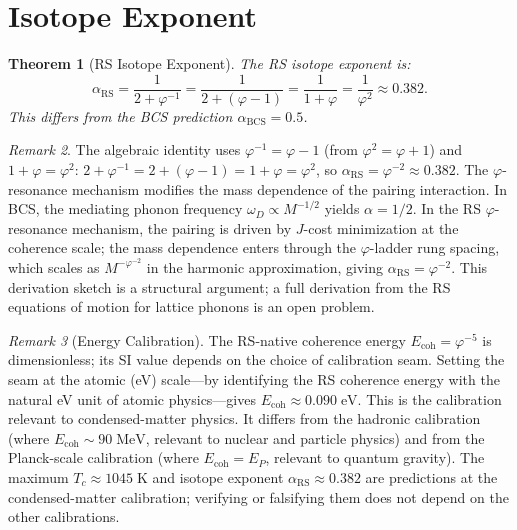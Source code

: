 \documentclass[12pt,a4paper]{article}
\newtheorem{theorem}{Theorem}[section]
\theoremstyle{definition}
\theoremstyle{remark}
\newtheorem{remark}[theorem]{Remark}
\begin{document}
\section{Isotope Exponent}
\label{sec:isotope}

\begin{theorem}[RS Isotope Exponent]
\label{thm:isotope}
The RS isotope exponent is:
\begin{equation}
  \boxed{\alpha_{\mathrm{RS}} = \frac{1}{2 + \varphi^{-1}}
  = \frac{1}{2 + (\varphi - 1)} = \frac{1}{1 + \varphi}
  = \frac{1}{\varphi^2} \approx 0.382.}
\end{equation}
This differs from the BCS prediction $\alpha_{\mathrm{BCS}} = 0.5$.
\end{theorem}

\begin{remark}
The algebraic identity uses $\varphi^{-1} = \varphi - 1$ (from
$\varphi^2 = \varphi + 1$) and $1 + \varphi = \varphi^2$:
$2 + \varphi^{-1} = 2 + (\varphi - 1) = 1 + \varphi = \varphi^2$,
so $\alpha_{\mathrm{RS}} = \varphi^{-2} \approx 0.382$.
The $\varphi$-resonance mechanism modifies the mass dependence
of the pairing interaction.  In BCS, the mediating phonon
frequency $\omega_D \propto M^{-1/2}$ yields $\alpha = 1/2$.  In
the RS $\varphi$-resonance mechanism, the pairing is driven by
$J$-cost minimization at the coherence scale; the mass dependence
enters through the $\varphi$-ladder rung spacing, which scales
as $M^{-\varphi^{-2}}$ in the harmonic approximation, giving
$\alpha_{\mathrm{RS}} = \varphi^{-2}$.  This derivation sketch is
a structural argument; a full derivation from the RS equations of
motion for lattice phonons is an open problem.
\end{remark}

\begin{remark}[Energy Calibration]
\label{rem:calibration}
The RS-native coherence energy $E_{\mathrm{coh}} = \varphi^{-5}$
is dimensionless; its SI value depends on the choice of
calibration seam.  Setting the seam at the atomic (eV) scale---by
identifying the RS coherence energy with the natural eV unit of
atomic physics---gives $E_{\mathrm{coh}} \approx 0.090\;\mathrm{eV}$.
This is the calibration relevant to condensed-matter physics.
It differs from the hadronic calibration (where
$E_{\mathrm{coh}} \sim 90\;\mathrm{MeV}$, relevant to nuclear
and particle physics) and from the Planck-scale calibration
(where $E_{\mathrm{coh}} = E_P$, relevant to quantum gravity).
The maximum $T_c \approx 1045\;\mathrm{K}$ and isotope exponent
$\alpha_{\mathrm{RS}} \approx 0.382$ are predictions at the
condensed-matter calibration; verifying or falsifying them does
not depend on the other calibrations.
\end{remark}
\end{document}
